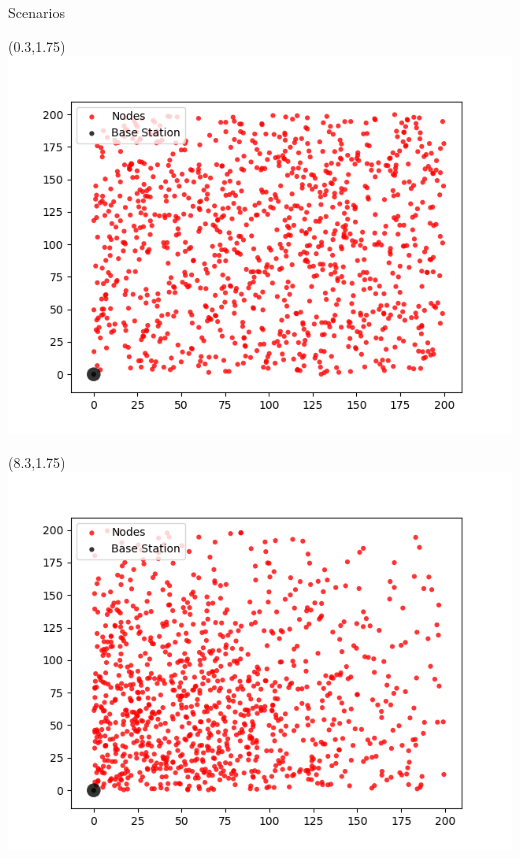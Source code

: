 \documentclass{beamer}
\begin{document}
\begin{frame}[t]{Scenarios} %

\begin{textblock}{0.8}(0.3,1.75)
\includegraphics[scale=0.371]{figure/Scen1.png}
\end{textblock}

\begin{textblock}{0.8}(8.3,1.75)
\includegraphics[scale=0.371]{figure/Scen2.png}
\end{textblock}


\end{frame}
\end{document}
